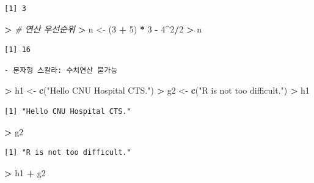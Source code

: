 \documentclass[12pt,a4paper]{book}
\newenvironment{Shaded}{\begin{snugshade}}{\end{snugshade}}
\newcommand{\KeywordTok}[1]{\textcolor[rgb]{0.13,0.29,0.53}{\textbf{#1}}}
\newcommand{\DecValTok}[1]{\textcolor[rgb]{0.00,0.00,0.81}{#1}}
\newcommand{\StringTok}[1]{\textcolor[rgb]{0.31,0.60,0.02}{#1}}
\newcommand{\CommentTok}[1]{\textcolor[rgb]{0.56,0.35,0.01}{\textit{#1}}}
\newcommand{\OperatorTok}[1]{\textcolor[rgb]{0.81,0.36,0.00}{\textbf{#1}}}
\newcommand{\ErrorTok}[1]{\textcolor[rgb]{0.64,0.00,0.00}{\textbf{#1}}}
\newcommand{\NormalTok}[1]{#1}
\theoremstyle{definition}
\theoremstyle{definition}
\theoremstyle{definition}
\theoremstyle{remark}
\begin{document}
\begin{verbatim}
[1] 3
\end{verbatim}

\begin{Shaded}
\begin{Highlighting}[]
\OperatorTok{>}\StringTok{ }\CommentTok{# 연산 우선순위}
\ErrorTok{>}\StringTok{ }\NormalTok{n <-}\StringTok{ }\NormalTok{(}\DecValTok{3} \OperatorTok{+}\StringTok{ }\DecValTok{5}\NormalTok{) }\OperatorTok{*}\StringTok{ }\DecValTok{3} \OperatorTok{-}\StringTok{ }\DecValTok{4}\OperatorTok{^}\DecValTok{2}\OperatorTok{/}\DecValTok{2}
\OperatorTok{>}\StringTok{ }\NormalTok{n}
\end{Highlighting}
\end{Shaded}

\begin{verbatim}
[1] 16
\end{verbatim}

\begin{verbatim}
- 문자형 스칼라: 수치연산 불가능
\end{verbatim}

\begin{Shaded}
\begin{Highlighting}[]
\OperatorTok{>}\StringTok{ }\NormalTok{h1 <-}\StringTok{ }\KeywordTok{c}\NormalTok{(}\StringTok{"Hello CNU Hospital CTS."}\NormalTok{)}
\OperatorTok{>}\StringTok{ }\NormalTok{g2 <-}\StringTok{ }\KeywordTok{c}\NormalTok{(}\StringTok{"R is not too difficult."}\NormalTok{)}
\OperatorTok{>}\StringTok{ }\NormalTok{h1}
\end{Highlighting}
\end{Shaded}

\begin{verbatim}
[1] "Hello CNU Hospital CTS."
\end{verbatim}

\begin{Shaded}
\begin{Highlighting}[]
\OperatorTok{>}\StringTok{ }\NormalTok{g2}
\end{Highlighting}
\end{Shaded}

\begin{verbatim}
[1] "R is not too difficult."
\end{verbatim}

\begin{Shaded}
\begin{Highlighting}[]
\OperatorTok{>}\StringTok{ }\NormalTok{h1 }\OperatorTok{+}\StringTok{ }\NormalTok{g2}
\end{Highlighting}
\end{Shaded}
\end{document}
